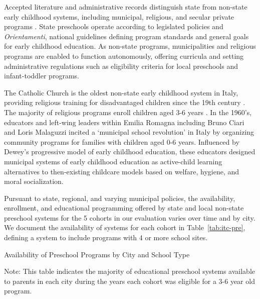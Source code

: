 Accepted literature and administrative records distinguish state from non-state early childhood systems, including municipal, religious, and secular private programs \citep{Padova-Admin-Data_1964-2011,Reggio-Admin-data_1966-2006,Reggio-Annual-Journals_1994-2011,OECD_2001_Italy-Country-Note,Ribolzi_2013_Italy}. State preschools operate according to legislated policies and \textit{Orientamenti}, national guidelines defining program standards and general goals for early childhood education. As non-state programs, municipalities and religious programs are enabled to function autonomously, offering curricula and setting administrative regulations such as eligibility criteria for local preschools and infant-toddler programs. 

The Catholic Church is the oldest non-state early childhood system in Italy, providing religious training for disadvantaged children since the 19th century \citep{OECD_2001_Italy-Country-Note}. The majority of religious programs enroll children aged 3-6 years \citep{Malizia-Cicatelli_2011_BOOK_Catholic-School}. In the 1960's, educators and left-wing leaders within Emilia Romagna including Bruno Ciari and Loris Malaguzzi incited a `municipal school revolution' in Italy by organizing community programs for families with children aged 0-6 years. Influenced by Dewey's progressive model of early childhood education, these educators designed municipal systems of early childhood education as active-child learning alternatives to then-existing childcare models based on welfare, hygiene, and moral socialization. 

Pursuant to state, regional, and varying municipal policies, the availability, enrollment, and educational programming offered by state and local non-state preschool systems for the 5 cohorts in our evaluation varies over time and by city. We document the availability of systems for each cohort in Table~\ref{tab:itc-pre}, defining a system to include programs with 4 or more school sites.

\begin{table}[H]
\centering
\caption{Availability of Preschool Programs by City and School Type}\label{tab:itc-pre}
\begin{adjustbox}{width=\textwidth}
\begin{threeparttable}
	
\begin{tablenotes}
Note: This table indicates the majority of educational preschool systems available to parents in each city during the years each cohort was eligible for a 3-6 year old program. 
\end{tablenotes}
\end{threeparttable}
\end{adjustbox}
\end{table}

